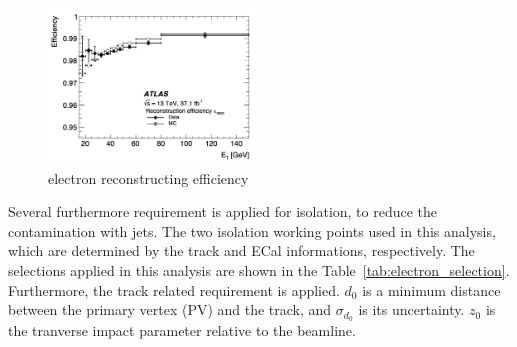 \begin{figure}[tbp]
\begin{center}
 \includegraphics[width=0.50\textwidth,keepaspectratio]{figures/recoElectron}
\caption{
electron reconstructing efficiency
}
\label{fig:recoElectron}
\end{center}
\end{figure}
Several furthermore requirement is applied for isolation, to reduce the contamination with jets. The two isolation working points used in this analysis, which are determined by the track and ECal informations, respectively. The selections applied in this analysis are shown in the Table~\ref{tab:electron_selection}.
Furthermore, the track related requirement is applied. $d_0$ is a minimum distance between the primary vertex (PV) and the track, and $\sigma_{d_0}$ is its uncertainty. $z_0$ is the tranverse impact parameter relative to the beamline.
\begin{table}[ht]
 \label{tab:electron_selection}
 \caption{Summary of electron selection used in this analysis}
\end{table}

